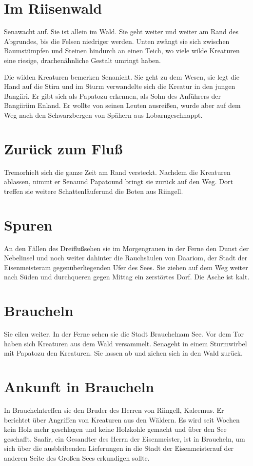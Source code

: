 \documentclass[12pt,a4paper,onecolumn,twoside,ngerman]{book}
\newcommand{\Sena}{Sena}
\newcommand{\Bangiri}{Bangiiri}
\newcommand{\Papato}{Papato}
\newcommand{\Enland}{Enland}
\newcommand{\Schattenlaufer}{Schattenläufer}
\newcommand{\Tremor}{Tremor}
\newcommand{\Lobarn}{Lobarn}
\newcommand{\Rhingell}{Riingell}
\newcommand{\Kalemus}{Kaleemus}
\newcommand{\Dreifluss}{Dreifluß}
\newcommand{\Braucheln}{Braucheln}
\newcommand{\Riesenwald}{Riisenwald}
\newcommand{\Eisenmeister}{Eisenmeister}
\newcommand{\Dariom}{Daariom}
\newcommand{\Safir}{Saafir}
\begin{document}
\section{Im \Riesenwald}
\Sena  wacht auf. Sie ist allein im Wald. Sie geht weiter und weiter am Rand des Abgrundes, bis die Felsen niedriger werden. Unten zwängt sie sich zwischen Baumstümpfen und Steinen hindurch an einen Teich, wo viele wilde Kreaturen eine riesige, drachenähnliche Gestalt umringt haben. 

Die wilden Kreaturen bemerken \Sena  nicht.  Sie geht zu dem Wesen, sie legt die Hand auf die Stirn und im Sturm verwandelte sich die Kreatur in den jungen \Bangiri  . Er gibt sich als \Papato  zu erkennen, als Sohn des Anführers der \Bangiri  im \Enland . Er wollte von seinen Leuten ausreißen, wurde aber auf dem Weg nach den Schwarzbergen von Spähern aus \Lobarn  geschnappt. 

\section{Zurück zum Fluß}
\Tremor  hielt sich die ganze Zeit am Rand versteckt. Nachdem die Kreaturen ablassen, nimmt er \Sena  und \Papato  und bringt sie zurück auf den Weg. Dort treffen sie weitere \Schattenlaufer  und die Boten aus  \Rhingell .

\section{Spuren}
An den Fällen des \Dreifluss  sehen sie im Morgengrauen in der Ferne den Dunst der Nebelinsel und noch weiter dahinter die Rauchsäulen von \Dariom , der Stadt der \Eisenmeister  am gegenüberliegenden Ufer des Sees. Sie ziehen auf dem Weg weiter nach Süden und durchqueren gegen Mittag ein zerstörtes Dorf. Die Asche ist kalt.

\section{\Braucheln}
Sie eilen weiter. In der Ferne sehen sie die Stadt \Braucheln  am See. Vor dem Tor haben sich Kreaturen aus dem Wald versammelt. \Sena  geht in einem Sturmwirbel mit \Papato  zu den Kreaturen. Sie lassen ab und ziehen sich in den Wald zurück.

\section{Ankunft in \Braucheln}
In \Braucheln  treffen sie den Bruder des Herren von \Rhingell , \Kalemus . Er berichtet über Angriffen von Kreaturen aus den Wäldern. Es wird seit Wochen kein Holz mehr geschlagen und keine Holzkohle gemacht und über den See geschafft.  \Safir , ein Gesandter des Herrn der \Eisenmeister , ist in \Braucheln , um sich über die ausbleibenden Lieferungen in die Stadt der \Eisenmeister  auf der anderen Seite des Großen Sees erkundigen sollte.
\end{document}

